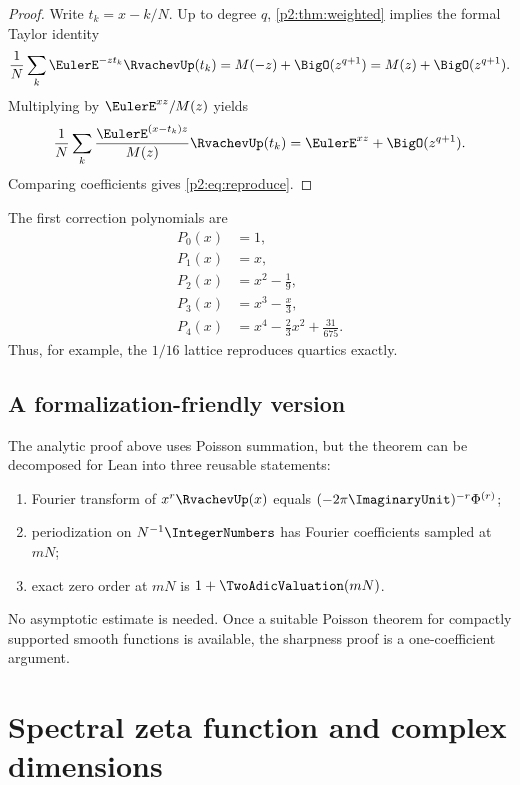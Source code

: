 \documentclass[11pt]{article}
\numberwithin{equation}{section}
\theoremstyle{definition}
\theoremstyle{remark}
\begin{document}
\begin{proof}
Write $t_k=x-k/N$.  Up to degree $q$, \cref{p2:thm:weighted} implies the formal
Taylor identity
\[
 \frac1N\sum_k\EulerE^{-zt_k}\RvachevUp(t_k)=M(-z)+\BigO(z^{q+1})
 =M(z)+\BigO(z^{q+1}).
\]
Multiplying by $\EulerE^{xz}/M(z)$ yields
\[
 \frac1N\sum_k\frac{\EulerE^{(x-t_k)z}}{M(z)}\RvachevUp(t_k)
 =\EulerE^{xz}+\BigO(z^{q+1}).
\]
Comparing coefficients gives \eqref{p2:eq:reproduce}.
\end{proof}

The first correction polynomials are
\begin{align}
 P_0(x)&=1,\nonumber\\
 P_1(x)&=x,\nonumber\\
 P_2(x)&=x^2-\frac19,\nonumber\\
 P_3(x)&=x^3-\frac{x}{3},\nonumber\\
 P_4(x)&=x^4-\frac23x^2+\frac{31}{675}.                   \label{p2:eq:P-first}
\end{align}
Thus, for example, the $1/16$ lattice reproduces quartics exactly.

\subsection{A formalization-friendly version}

The analytic proof above uses Poisson summation, but the theorem can be decomposed
for Lean into three reusable statements:
\begin{enumerate}
\item Fourier transform of $x^r\RvachevUp(x)$ equals
      $(-2\pi\ImaginaryUnit)^{-r}\Phi^{(r)}$;
\item periodization on $N^{-1}\IntegerNumbers$ has Fourier coefficients sampled at $mN$;
\item exact zero order at $mN$ is $1+\TwoAdicValuation(mN)$.
\end{enumerate}
No asymptotic estimate is needed.  Once a suitable Poisson theorem for compactly
supported smooth functions is available, the sharpness proof is a one-coefficient
argument.

\section{Spectral zeta function and complex dimensions}
\label{p2:sec:zeta}
\end{document}
